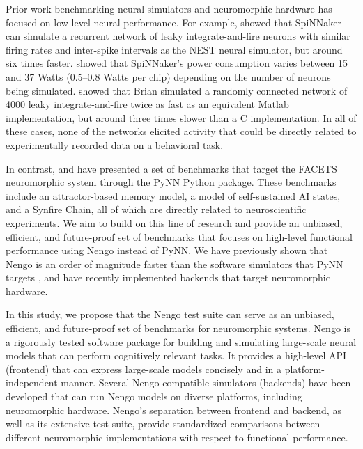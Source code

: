 \documentclass{frontiersSCNS}
\begin{document}
Prior work benchmarking neural simulators
and neuromorphic hardware has focused
on low-level neural performance.
For example, \citet{sharp2013}
showed that SpiNNaker can simulate
a recurrent network of leaky integrate-and-fire neurons
with similar firing rates and inter-spike intervals
as the NEST neural simulator,
but around six times faster.
\citet{stromatias2013} showed that
SpiNNaker's power consumption varies
between 15 and 37 Watts
(0.5--0.8 Watts per chip)
depending on the number of neurons
being simulated.
\citet{goodman2008brian} showed that
Brian simulated a randomly connected
network of 4000 leaky integrate-and-fire
twice as fast as an equivalent Matlab implementation,
but around three times slower than
a C implementation.
In all of these cases,
none of the networks
elicited activity that could be
directly related to experimentally recorded data
on a behavioral task.

In contrast,
\citet{ehrlich2010} and \citet{bruderle2011}
have presented a set of benchmarks that target
the FACETS neuromorphic system
through the PyNN Python package.
These benchmarks include
an attractor-based memory model,
a model of self-sustained AI states,
and a Synfire Chain,
all of which are
directly related to neuroscientific experiments.
We aim to build on this line of research
and provide an unbiased,
efficient, and future-proof set
of benchmarks that focuses
on high-level functional performance
using Nengo instead of PyNN.
We have previously shown that Nengo
is an order of magnitude faster than
the software simulators that PyNN targets
\citep{bekolay2013},
and have recently implemented backends
that target neuromorphic hardware.

In this study,
we propose that the Nengo test suite
can serve as an unbiased, efficient, and future-proof
set of benchmarks for neuromorphic systems.
Nengo is a rigorously tested software package
for building and simulating
large-scale neural models
that can perform cognitively relevant tasks.
It provides a high-level API (frontend)
that can express large-scale models concisely
and in a platform-independent manner.
Several Nengo-compatible simulators (backends)
have been developed that can
run Nengo models on diverse platforms,
including neuromorphic hardware.
Nengo's separation between frontend and backend,
as well as its extensive test suite,
provide standardized comparisons
between different neuromorphic implementations
with respect to functional performance.
\end{document}
